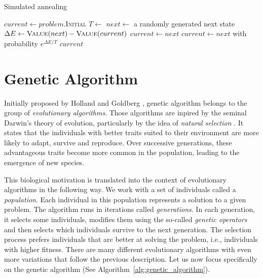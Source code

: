\begin{algorithm}
    
    \begin{algorithmic}
    \caption{Simulated annealing} \label{alg:simulated_annealing}
    \State $current \gets problem$.I\textsc{nitial}
        \State $T \gets$ 
        \State $next \gets$ a randomly generated next state
        \State $\Delta E \gets \Call{Value}{next} - \Call{Value}{current}$
            \State $current \gets next$
        \Else
            \State $current \gets next$ with probability $e^{\Delta E / T}$
        \EndIf
    \EndFor
    \State \Return $current$
    \EndFunction
    \end{algorithmic}
\end{algorithm}

\section{Genetic Algorithm} \label{sec:genetic_algorithm}


Initially proposed by Holland \cite{holland1975adaptation} and Goldberg \cite{goldberg1989genetic}, genetic algorithm \cite{russell2020artificial,vanneschi2023lectures} belongs to the group of \textit{evolutionary algorithms}. Those algorithms are inpired by the seminal Darwin's theory of evolution, particularly by the idea of \textit{natural selection} \cite{darwin1859origin}. It states that the individuals with better traits suited to their environment are more likely to adapt, survive and reproduce. Over successive generations, these advantageous traits become more common in the population, leading to the emergence of new species.

This biological motivation is translated into the context of evolutionary algorithms in the following way. We work with a set of individuals called a \textit{population}. Each individual in this population represents a solution to a given problem. The algorithm runs in iterations called \textit{generations}. In each generation, it selects some individuals, modifies them using the so-called \textit{genetic operators} and then selects which individuals survive to the next generation. The selection process prefers individuals that are better at solving the problem, i.e., individuals with higher fitness.
There are many different evolutionary algorithms with even more variations that follow the previous description. Let us now focus specifically on the genetic algorithm (See Algorithm~\ref{alg:genetic_algorithm}).

